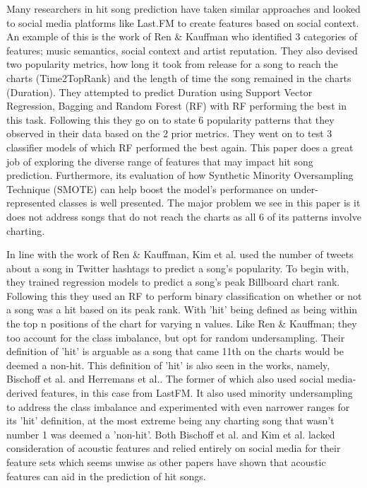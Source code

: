 \documentclass[conference]{IEEEtran}
\begin{document}
Many researchers in hit song prediction have taken similar approaches and looked to social media platforms like Last.FM to create features based on social context. An example of this is the work of Ren \& Kauffman\cite{b5}
who identified 3 categories of features; music semantics, social context and artist reputation. They also devised two popularity metrics, how long it took from release for a song to reach the charts (Time2TopRank) and the length of time the song remained in the charts (Duration). They attempted to predict Duration using Support Vector Regression, Bagging and Random Forest (RF) with RF performing the best in this task. Following this they go on to state 6 popularity patterns that they observed in their data based on the 2 prior metrics. They went on to test 3 classifier models of which RF performed the best again. This paper does a great job of exploring the diverse range of features that may impact hit song prediction. Furthermore, its evaluation of how Synthetic Minority Oversampling Technique (SMOTE)\cite{b8}
can help boost the model's performance on under-represented classes is well presented. The major problem we see in this paper is it does not address songs that do not reach the charts as all 6 of its patterns involve charting.

In line with the work of Ren \& Kauffman\cite{b5}, Kim et al.\cite{b9}
used the number of tweets about a song in Twitter hashtags to predict a song's popularity. To begin with, they trained regression models to predict a song's peak Billboard chart rank. Following this they used an RF to perform binary classification on whether or not a song was a hit based on its peak rank. With 'hit' being defined as being within the top n positions of the chart for varying n values. Like Ren \& Kauffman\cite{b5}; they too account for the class imbalance, but opt for random undersampling. Their definition of 'hit' is arguable as a song that came 11th on the charts would be deemed a non-hit. This definition of 'hit' is also seen in the works, namely, Bischoff et al.\cite{b10} and  Herremans et al.\cite{b11}. The former of which also used social media-derived features, in this case from LastFM. It also used minority undersampling to address the class imbalance and experimented with even narrower ranges for its 'hit' definition, at the most extreme being any charting song that wasn't number 1 was deemed a 'non-hit'. Both Bischoff et al.\cite{b10} and Kim et al.\cite{b9}
lacked consideration of acoustic features and relied entirely on social media for their feature sets which seems unwise as other papers have shown that acoustic features can aid in the prediction of hit songs\cite{b5}\cite{b11}.
\end{document}
